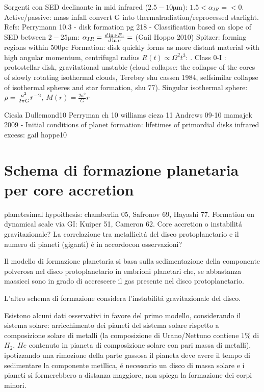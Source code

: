 \begin{workout}
Sorgenti con SED declinante in mid infrared ($2.5-10\si{\micro\meter}$): $1.5<\alpha_{IR}=<0$. Active/passive: mass infall convert G into thermalradiation/reprocessed starlight.
Refs: Perrymann 10.3 - disk formation pg 218 - 
Classification based on slope of SED between $2-25\si{\micro\meter}$: $\alpha_{IR}=\frac{d \ln{\nu F_{\nu}}}{d \ln{\nu}}=$ (Gail Hoppo 2010)
Spitzer: forming regions within 500pc
Formation: disk quickly forms as more distant material with high angular momentum, centrifugal radius $R(t)\propto\Omega^2 t^3$: . Class 0-I : protostellar disk, gravitational unstable (cloud collapse: the collapse of the cores of slowly rotating isothermal clouds, Terebey shu cassen 1984, selfsimilar collapse of isothermal spheres and star formation, shu 77). Singular isothermal sphere: $\rho=\frac{a^2}{2\pi G}r^{-2}$, $M(r)=\frac{2a^2}{G}r$
\end{workout}

\begin{workout}
Ciesla Dullemond10 
Perryman ch 10
williams cieza 11
Andrews 09-10
mamajek 2009 - Initial conditions of planet formation: lifetimes of primordial disks
infrared excess: gail hoppe10
\end{workout}


{\let\clearpage\relax\let\cleardoublepage\relax
\chapter{Schema di formazione planetaria per core accretion}
}

\begin{workout}[Refs GI vs CA]
planetesimal hypoithesis: chamberlin 05, Safronov 69, Hayashi 77. Formation on dynamical scale via GI: Kuiper 51, Cameron 62.
Core accretion o instabilit\'a gravitazionale?
La correlazione tra metallicit\'a del disco protoplanetario e il numero di pianeti (giganti) \'e in accordocon osservazioni?
\end{workout}


Il modello di formazione planetaria si basa sulla sedimentazione della componente polverosa nel disco protoplanetario in embrioni planetari che, se abbastanza massicci sono in grado di accrescere il gas presente nel disco protoplanetario.

L'altro schema di formazione considera l'instabilit\'a gravitazionale del disco. 

Esistono alcuni dati osservativi in favore del primo modello, considerando il sistema solare: arricchimento dei pianeti del sistema solare rispetto a composizione solare di metalli (la composizione di Urano/Nettuno contiene $1\%$ di $H_2$, $He$ contenuto in pianeta di composizione solare con pari massa di metalli), ipotizzando una rimozione della parte gassosa il pianeta deve avere il tempo di sedimentare la componente metllica, \'e necessario un disco di massa solare e i pianeti si formerebbero a distanza maggiore, non spiega la formazione dei corpi minori.

